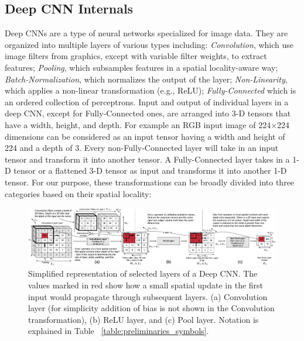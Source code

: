 \subsection{Deep CNN Internals}\label{sec:cnn_internals}
Deep CNNs are a type of neural networks specialized for image data.
They are organized into multiple layers of various types including: \textit{Convolution}, which use image filters from graphics, except with variable filter weights, to extract features; \textit{Pooling}, which subsamples features in a spatial locality-aware way; \textit{Batch-Normalization}, which normalizes the output of the layer; \textit{Non-Linearity}, which applies a non-linear transformation (e.g., ReLU); \textit{Fully-Connected} which is an ordered collection of perceptrons.
Input and output of individual layers in a deep CNN, except for Fully-Connected ones, are arranged into 3-D tensors that have a width, height, and depth.
For example an RGB input image of 224$\times$224 dimensions can be considered as an input tensor having a width and height of 224 and a depth of 3.
Every non-Fully-Connected layer will take in an input tensor and transform it into another tensor.
A Fully-Connected layer takes in a 1-D tensor or a flattened 3-D tensor as input and transforms it into another 1-D tensor.
For our purpose, these transformations can be broadly divided into three categories based on their spatial locality:

\begin{figure}[t]
\includegraphics[width=\textwidth]{images/cnn_simplified}
\caption{Simplified representation of selected layers of a Deep CNN. The values marked in red show how a small spatial update in the first input would propagate through subsequent layers. (a) Convolution layer (for simplicity addition of bias is not shown in the Convolution transformation), (b) ReLU layer, and (c) Pool layer. Notation is explained in Table ~\ref{table:preliminaries_symbols}.}
\label{fig:cnn_simplified}
\end{figure}

